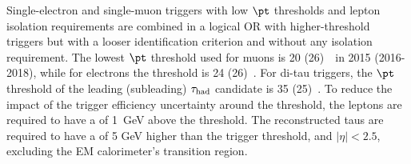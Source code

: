 \documentclass[PAPER, coverpage, atlasdraft=true, texlive=2016, UKenglish]{\ATLASLATEXPATH atlasdoc}
\begin{document}
Single-electron and single-muon triggers with low $\pt$ thresholds and lepton isolation requirements are combined in a logical OR 
with higher-threshold triggers but with a looser identification criterion and without any isolation requirement.
The lowest $\pt$ threshold used for muons is 20 (26)~\gev\ in 2015 (2016-2018), while for electrons the threshold is 24 (26)~\gev.
For di-tau triggers, the $\pt$ threshold of the leading (subleading) $\tau_{\mathrm{had}}$ candidate is 35 (25)~\gev.
To reduce the impact of the trigger efficiency uncertainty around the threshold, the leptons are required to have a \pt of 1~GeV above the threshold. 
The reconstructed taus are required to have a \pt of 5 GeV higher than the trigger threshold, and $|\eta|<2.5$, excluding the EM calorimeter's transition region.
\end{document}
